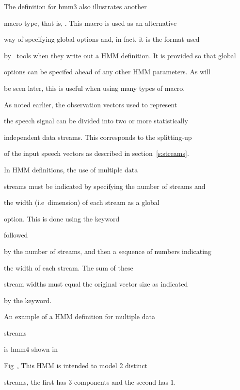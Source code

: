 The definition for \textsf{hmm3} also illustrates another


macro type, that is, .  This macro is used as an alternative


way of specifying global options and, in fact, it is the format used


by \HTK\ tools when they write out a HMM definition.  It is provided so that global


options can be specifed ahead of any other HMM parameters.  As will


be seen later, this is useful when using many types of macro.







As noted earlier, the observation vectors used to represent


the speech signal can be divided into two or more statistically


independent data streams.  This corresponds to the splitting-up


of the input speech vectors as described in section~\ref{s:streams}.


In HMM definitions, the use of multiple data


streams must be indicated by specifying the number of streams and


the width (i.e\ dimension) of each stream as a global


option.  This is done using the keyword 


 followed


by the number of streams, and then a sequence of numbers indicating


the width of each stream.  The sum of these


stream widths must equal the original vector size as indicated


by the   keyword. 





An example of a HMM definition for multiple data 


streams


is \textsf{hmm4} shown in 


Fig~\href{f:hmm4def}.  This HMM is intended to model 2 distinct


streams, the first has 3 components and the second has 1.


